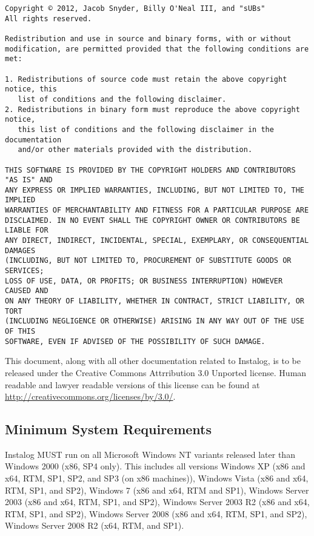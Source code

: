 \documentclass[letterpaper,12pt]{article}
\begin{document}
\begin{verbatim}
Copyright © 2012, Jacob Snyder, Billy O'Neal III, and "sUBs"
All rights reserved.

Redistribution and use in source and binary forms, with or without
modification, are permitted provided that the following conditions are met: 

1. Redistributions of source code must retain the above copyright notice, this
   list of conditions and the following disclaimer. 
2. Redistributions in binary form must reproduce the above copyright notice,
   this list of conditions and the following disclaimer in the documentation
   and/or other materials provided with the distribution. 

THIS SOFTWARE IS PROVIDED BY THE COPYRIGHT HOLDERS AND CONTRIBUTORS "AS IS" AND
ANY EXPRESS OR IMPLIED WARRANTIES, INCLUDING, BUT NOT LIMITED TO, THE IMPLIED
WARRANTIES OF MERCHANTABILITY AND FITNESS FOR A PARTICULAR PURPOSE ARE
DISCLAIMED. IN NO EVENT SHALL THE COPYRIGHT OWNER OR CONTRIBUTORS BE LIABLE FOR
ANY DIRECT, INDIRECT, INCIDENTAL, SPECIAL, EXEMPLARY, OR CONSEQUENTIAL DAMAGES
(INCLUDING, BUT NOT LIMITED TO, PROCUREMENT OF SUBSTITUTE GOODS OR SERVICES;
LOSS OF USE, DATA, OR PROFITS; OR BUSINESS INTERRUPTION) HOWEVER CAUSED AND
ON ANY THEORY OF LIABILITY, WHETHER IN CONTRACT, STRICT LIABILITY, OR TORT
(INCLUDING NEGLIGENCE OR OTHERWISE) ARISING IN ANY WAY OUT OF THE USE OF THIS
SOFTWARE, EVEN IF ADVISED OF THE POSSIBILITY OF SUCH DAMAGE.
\end{verbatim}

This document, along with all other documentation related to Instalog,  is to be
released under the Creative Commons Attrribution 3.0 Unported license. Human
readable and lawyer readable versions of this license can be found at
\url{http://creativecommons.org/licenses/by/3.0/}.

\subsection{Minimum System Requirements}
Instalog MUST run on all Microsoft Windows NT variants released later than
Windows 2000 (x86, SP4 only). This includes all versions Windows XP (x86 and
x64, RTM, SP1, SP2, and SP3 (on x86 machines)), Windows Vista (x86 and x64, RTM,
SP1, and SP2), Windows 7 (x86 and x64, RTM and SP1), Windows Server 2003 (x86
and x64, RTM, SP1, and SP2), Windows Server 2003 R2 (x86 and x64, RTM, SP1, and
SP2), Windows Server 2008 (x86 and x64, RTM, SP1, and SP2), Windows Server 2008
R2 (x64, RTM, and SP1).
\end{document}
